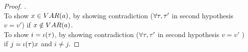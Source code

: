 \begin{proof}.
	\\
	To show $x \in VAR(a)$, by showing contradiction ($\forall \mathtt{\tau}, \mathtt{\tau}'$ in second hypothesis  $v = v'$)
	 if $x \notin VAR(a)$.
	 \\
	To show $i = \iota(\mathtt{\tau})$, by showing contradiction ($\forall \mathtt{\tau}, \mathtt{\tau}'$ in second hypothesis  $v = v'$ ) 
	if $j = \iota(\mathtt{\tau}) x$ and $i \neq j$.
\end{proof}
%
%
